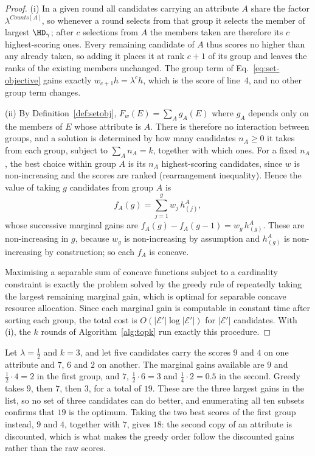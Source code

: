 \begin{proof}
(i) In a given round all candidates carrying an attribute $A$ share the factor $\lambda^{Counts[A]}$, so whenever a round selects from that group it selects the member of largest $\HD_\gamma$; after $c$ selections from $A$ the members taken are therefore its $c$ highest-scoring ones.
Every remaining candidate of $A$ thus scores no higher than any already taken, so adding it places it at rank $c+1$ of its group and leaves the ranks of the existing members unchanged.
The group term of Eq.~\eqref{eq:set-objective} gains exactly $w_{c+1}h=\lambda^{c}h$, which is the score of line~4, and no other group term changes.

(ii) By Definition~\ref{def:setobj}, $F_w(E)=\sum_A g_A(E)$ where $g_A$ depends only on the members of $E$ whose attribute is $A$.
There is therefore no interaction between groups, and a solution is determined by how many candidates $n_A\ge0$ it takes from each group, subject to $\sum_A n_A=k$, together with which ones.
For a fixed $n_A$, the best choice within group $A$ is its $n_A$ highest-scoring candidates, since $w$ is non-increasing and the scores are ranked (rearrangement inequality).
Hence the value of taking $g$ candidates from group $A$ is
\[
f_A(g)=\sum_{j=1}^{g} w_j\, h^A_{(j)},
\]
whose successive marginal gains are $f_A(g)-f_A(g-1)=w_g\,h^A_{(g)}$.
These are non-increasing in $g$, because $w_g$ is non-increasing by assumption and $h^A_{(g)}$ is non-increasing by construction; so each $f_A$ is concave.

Maximising a separable sum of concave functions subject to a cardinality constraint is exactly the problem solved by the greedy rule of repeatedly taking the largest remaining marginal gain, which is optimal for separable concave resource allocation.
Since each marginal gain is computable in constant time after sorting each group, the total cost is $O(|\mathcal{E}'|\log|\mathcal{E}'|)$ for $|\mathcal{E}'|$ candidates.
With (i), the $k$ rounds of Algorithm~\ref{alg:topk} run exactly this procedure.
\end{proof}



\begin{example}
\label{ex:greedy}
Let $\lambda=\tfrac12$ and $k=3$, and let five candidates carry the scores $9$ and $4$ on one attribute and $7$, $6$ and $2$ on another.
The marginal gains available are $9$ and $\tfrac12\cdot4=2$ in the first group, and $7$, $\tfrac12\cdot6=3$ and $\tfrac14\cdot2=0.5$ in the second.
Greedy takes $9$, then $7$, then $3$, for a total of $19$.
These are the three largest gains in the list, so no set of three candidates can do better, and enumerating all ten subsets confirms that $19$ is the optimum.
Taking the two best scores of the first group instead, $9$ and $4$, together with $7$, gives $18$: the second copy of an attribute is discounted, which is what makes the greedy order follow the discounted gains rather than the raw scores.
\end{example}



